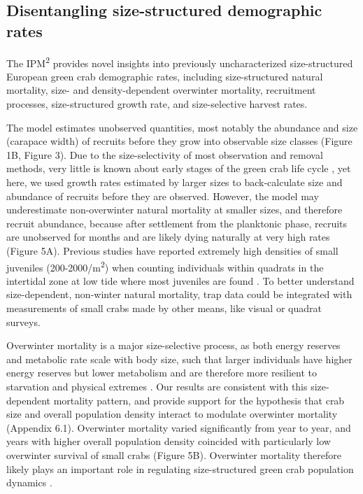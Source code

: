 \documentclass{article}
\begin{document}
\subsection{Disentangling size-structured demographic rates}

The IPM\textsuperscript{2} provides novel insights into previously uncharacterized size-structured European green crab demographic rates, including size-structured natural mortality, size- and density-dependent overwinter mortality, recruitment processes, size-structured growth rate, and size-selective harvest rates. 

The model estimates unobserved quantities, most notably the abundance and size (carapace width) of recruits before they grow into observable size classes (Figure 1B, Figure 3). Due to the size-selectivity of most observation and removal methods, very little is known about early stages of the green crab life cycle \parencite{yamada2005growth}, yet here, we used growth rates estimated by larger sizes to back-calculate size and abundance of recruits before they are observed. However, the model may underestimate non-overwinter natural mortality at smaller sizes, and therefore recruit abundance, because after settlement from the planktonic phase, recruits are unobserved for months and are likely dying naturally at very high rates (Figure 5A). Previous studies have reported extremely high densities of small juveniles (200-2000/m\textsuperscript{2}) when counting individuals within quadrats in the intertidal zone at low tide where most juveniles are found \parencite{breteler1976settlement, thiel1994recruitment}. To better understand size-dependent, non-winter natural mortality, trap data could be integrated with measurements of small crabs made by other means, like visual or quadrat surveys.

Overwinter mortality is a major size-selective process, as both energy reserves and metabolic rate scale with body size, such that larger individuals have higher energy reserves but lower metabolism and are therefore more resilient to starvation and physical extremes \parencite{carlson2008seasonal, sogard1997size}. Our results are consistent with this size-dependent mortality pattern, and provide support for the hypothesis that crab size and overall population density interact to modulate overwinter mortality (Appendix 6.1). Overwinter mortality varied significantly from year to year, and years with higher overall population density coincided with particularly low overwinter survival of small crabs (Figure 5B). Overwinter mortality therefore likely plays an important role in regulating size-structured green crab population dynamics \parencite{henderson1988size}. 
\end{document}
